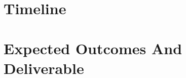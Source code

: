 \documentclass{article}
\begin{document}
\section{Timeline}
\label{sec:timeline}

\section{Expected Outcomes And Deliverable}


\end{document}
